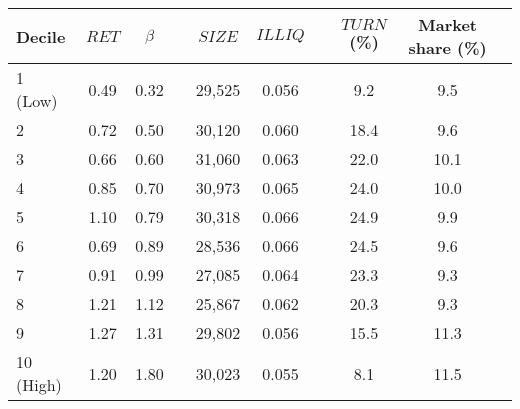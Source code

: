 \begin{tabular}{@{}lccccccccc@{}}
	\toprule
	Decile & $\textit{RET}$ & $\beta$ && $\textit{SIZE}$ & $\textit{ILLIQ}$ && $\textit{TURN}$ (\%) & Market share (\%) \\ \midrule
1 (Low) & 0.49 & 0.32 && 29,525 & 0.056 && 9.2 & 9.5 \\
2       & 0.72 & 0.50 && 30,120 & 0.060 && 18.4 & 9.6 \\
3       & 0.66 & 0.60 && 31,060 & 0.063 && 22.0 & 10.1 \\
4       & 0.85 & 0.70 && 30,973 & 0.065 && 24.0 & 10.0 \\
5       & 1.10 & 0.79 && 30,318 & 0.066 && 24.9 & 9.9 \\
6       & 0.69 & 0.89 && 28,536 & 0.066 && 24.5 & 9.6 \\
7       & 0.91 & 0.99 && 27,085 & 0.064 && 23.3 & 9.3 \\
8       & 1.21 & 1.12 && 25,867 & 0.062 && 20.3 & 9.3 \\
9       & 1.27 & 1.31 && 29,802 & 0.056 && 15.5 & 11.3 \\
10 (High) & 1.20 & 1.80 && 30,023 & 0.055 && 8.1 & 11.5 \\
	\bottomrule
\end{tabular}